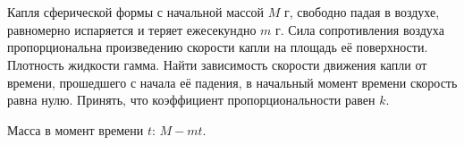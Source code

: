

\section{}

Капля сферической формы с начальной массой $M $ г, свободно падая в воздухе, равномерно испаряется и теряет ежесекундно $m$ г. Сила сопротивления воздуха пропорциональна произведению скорости капли на площадь её поверхности. Плотность жидкости гамма. Найти зависимость скорости движения капли от времени, прошедшего с начала её падения, в начальный момент времени скорость равна нулю. Принять, что коэффициент пропорциональности равен $k$.

Масса в момент времени $t$: $M-mt$.

